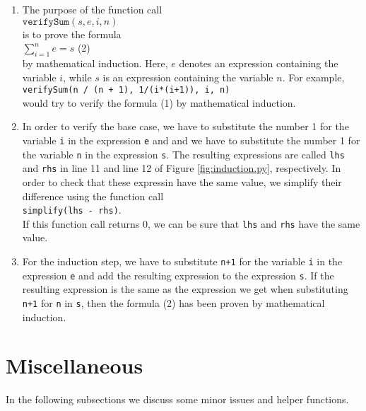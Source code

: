 \documentclass{report}
\begin{document}
\begin{enumerate}
\item The purpose of the function call
      \\[0.2cm]
      \hspace*{1.3cm}
      $\texttt{verifySum}(s, e, i, n)$
      \\[0.2cm]
      is to prove the formula
      \\[0.2cm]
      \hspace*{1.3cm}
      $\sum\limits_{i=1}^n e = s$  \hspace*{\fill} (2)
      \\[0.2cm]
      by mathematical induction.
      Here, $e$ denotes an expression containing the variable $i$, while $s$ is an expression containing
      the variable $n$.  For example, 
      \\[0.2cm]
      \hspace*{1.3cm}
      \texttt{verifySum(n / (n + 1), 1/(i*(i+1)), i, n)}
      \\[0.2cm]
      would try to verify the formula (1) by mathematical induction.
\item In order to verify the base case, we have to substitute the number 1 for the variable
      \texttt{i} in the expression \texttt{e} and and we have to substitute the number 1 for the
      variable \texttt{n} in the expression \texttt{s}.  The resulting expressions are called
      \texttt{lhs} and \texttt{rhs} in line 11 and line 12 of Figure \ref{fig:induction.py}, respectively.
      In order to check that these expressin have the same value, we simplify their difference
      using the function call
      \\[0.2cm]
      \hspace*{1.3cm}
      \texttt{simplify(lhs - rhs)}.
      \\[0.2cm]
      If this function call returns 0, we can be sure that \texttt{lhs} and \texttt{rhs} have the
      same value.
\item For the induction step, we have to substitute \texttt{n+1} for the variable \texttt{i} in the
      expression \texttt{e} and add the resulting expression to the expression \texttt{s}.  If the
      resulting expression is the same as the expression we get when substituting \texttt{n+1} for
      \texttt{n} in \texttt{s}, then the formula (2) has been proven by mathematical induction.
\end{enumerate}

\section{Miscellaneous}
In the following subsections we discuss some minor issues and helper functions.
\end{document}
